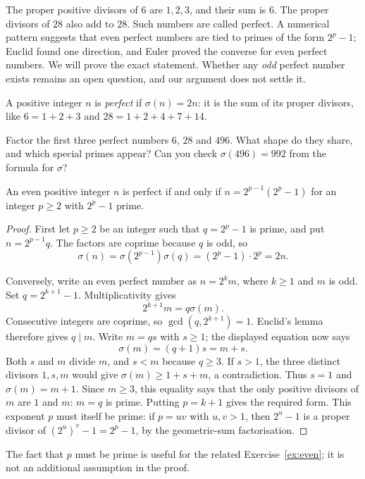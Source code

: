 The proper positive divisors of $6$ are $1,2,3$, and their sum is $6$. The proper divisors of $28$ also add to $28$. Such numbers are called perfect. A numerical pattern suggests that even perfect numbers are tied to primes of the form $2^p-1$; Euclid found one direction, and Euler proved the converse for even perfect numbers. We will prove the exact statement. Whether any \emph{odd} perfect number exists remains an open question, and our argument does not settle it.

A positive integer $n$ is \emph{perfect} if $\sigma(n)=2n$: it is the sum of its proper divisors, like $6=1+2+3$ and $28=1+2+4+7+14$.

\begin{think}
Factor the first three perfect numbers $6$, $28$ and $496$. What shape do they share, and which special primes appear? Can you check $\sigma(496)=992$ from the formula for $\sigma$?
\end{think}

\begin{theorem}\label{thm:perfect}
An even positive integer $n$ is perfect if and only if
$n=2^{p-1}(2^p-1)$ for an integer $p\ge2$ with $2^p-1$ prime.
\end{theorem}
\begin{proof}
First let $p\ge2$ be an integer such that $q=2^p-1$ is prime,
and put $n=2^{p-1}q$. The factors are coprime because $q$ is odd, so
\[
\sigma(n)=\sigma(2^{p-1})\sigma(q)
=(2^p-1)\cdot2^p=2n.
\]

Conversely, write an even perfect number as $n=2^km$, where $k\ge1$
and $m$ is odd. Set $q=2^{k+1}-1$. Multiplicativity gives
\[
2^{k+1}m=q\sigma(m).
\]
Consecutive integers are coprime, so $\gcd(q,2^{k+1})=1$.
Euclid's lemma therefore gives $q\mid m$. Write $m=qs$ with $s\ge1$;
the displayed equation now says
\[
\sigma(m)=(q+1)s=m+s.
\]
Both $s$ and $m$ divide $m$, and $s<m$ because $q\ge3$.
If $s>1$, the three distinct divisors $1,s,m$ would give
$\sigma(m)\ge1+s+m$, a contradiction. Thus $s=1$ and
$\sigma(m)=m+1$. Since $m\ge3$, this equality says that the only
positive divisors of $m$ are $1$ and $m$: $m=q$ is prime.
Putting $p=k+1$ gives the required form.
This exponent $p$ must itself be prime: if $p=uv$ with $u,v>1$, then
$2^u-1$ is a proper divisor of $(2^u)^v-1=2^p-1$, by the geometric-sum
factorisation.
\end{proof}
The fact that $p$ must be prime is useful for the related
Exercise~\ref{ex:even}; it is not an additional assumption in the proof.


